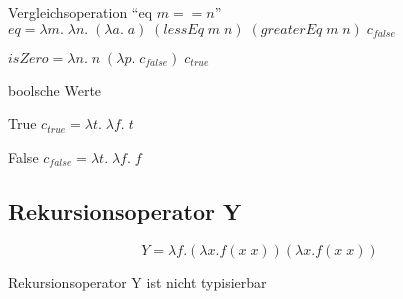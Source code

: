 \begin{compactitem}
\begin{compactitem}
			\item Vergleichsoperation \enquote{eq $m == n$} $eq = \lambda m.\; \lambda n.\; (\lambda a.\; a)\; (lessEq\; m\; n)\; (greaterEq\; m\; n)\; c_{false}$
			\item $isZero = \lambda n.\; n\; (\lambda p.\; c_{false})\; c_{true}$
		\end{compactitem}
	\item boolsche Werte
		\begin{compactitem}
			\item True $c_{true} = \lambda t.\; \lambda f.\; t$
			\item False $c_{false} = \lambda t.\; \lambda f.\; f$
		\end{compactitem}
\end{compactitem}

\subsection{Rekursionsoperator Y }
$$Y=\lambda f. (\lambda x. f (x\; x))(\lambda x.f(x\; x))$$
\begin{compactitem}
	\item Rekursionsoperator Y ist nicht typisierbar 
\end{compactitem}

